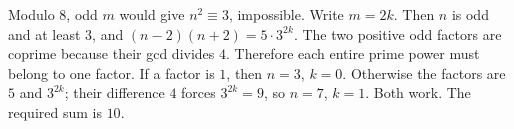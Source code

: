 Modulo $8$, odd $m$ would give $n^2\equiv3$, impossible. Write $m=2k$. Then $n$ is odd and at least $3$, and $(n-2)(n+2)=5\cdot3^{2k}$. The two positive odd factors are coprime because their gcd divides $4$. Therefore each entire prime power must belong to one factor. If a factor is $1$, then $n=3$, $k=0$. Otherwise the factors are $5$ and $3^{2k}$; their difference $4$ forces $3^{2k}=9$, so $n=7$, $k=1$. Both work. The required sum is $\boxed{10}$.
